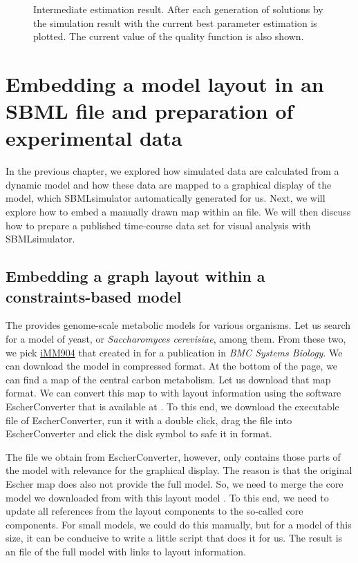 \begin{figure}[h]
\centering
{}
\caption[Intermediate estimation result]{Intermediate estimation result.
After each generation of solutions by \EvA the simulation result with the current best parameter estimation is plotted.
The current value of the quality function is also shown.
}
\label{fig:estimationResult}
\end{figure}


\chapter{Embedding a model layout in an SBML file and preparation of experimental data}

In the previous chapter, we explored how simulated data are calculated from a dynamic model and how these data are mapped to a graphical display of the model, which SBMLsimulator automatically generated for us.
Next, we will explore how to embed a manually drawn map within an \SBML file.
We will then discuss how to prepare a published time-course data set for visual analysis with SBMLsimulator.

\section{Embedding a graph layout within a constraints-based model}

The \BiGG provides genome-scale metabolic models for various organisms.
Let us search for a model of yeast, or \emph{Saccharomyces cerevisiae}, among them.
From these two, we pick \href{https://identifiers.org/bigg.model/iMM904}{iMM904} that \citeauthor{Mo2009} created in \citeyear{Mo2009} for a publication in \emph{BMC Systems Biology}.
We can download the model in compressed \SBML format.
At the bottom of the page, we can find a map of the central carbon metabolism.
Let us download that map \JSON format.
We can convert this map to \SBML with layout information using the software EscherConverter \citep{King2015a} that is available at .
To this end, we download the executable \JAR file of EscherConverter, run it with a double click, drag the \JSON file into EscherConverter and click the disk symbol to safe it in \SBML format.

The \SBML file we obtain from EscherConverter, however, only contains those parts of the model with relevance for the graphical display.
The reason is that the original Escher map does also not provide the full model.
So, we need to merge the core model we downloaded from \BiGG with this \SBML layout model \citep{Gauges2015}.
To this end, we need to update all references from the layout components to the so-called \SBML core components.
For small models, we could do this manually, but for a model of this size, it can be conducive to write a little script that does it for us.
The result is an \SBML file of the full model with links to layout information.


